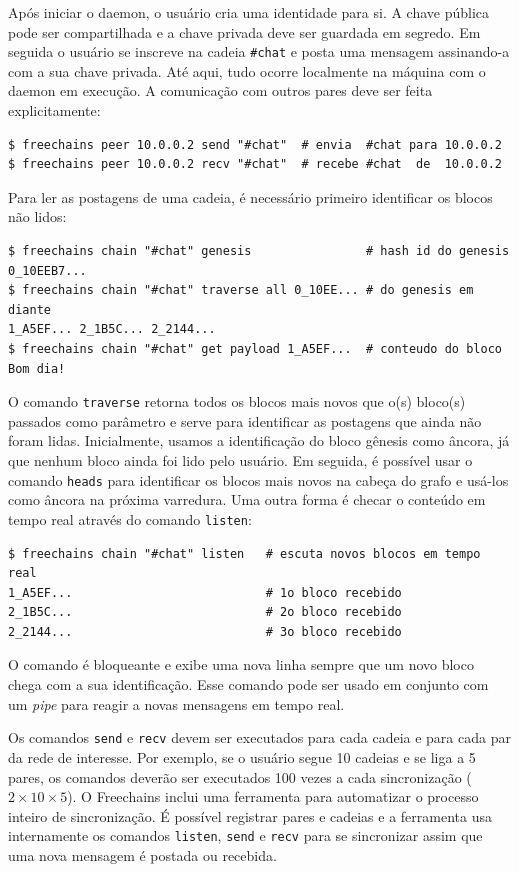 \documentclass[12pt]{article}
\newcommand{\FC} {Freechains\xspace}
\begin{document}
Após iniciar o daemon, o usuário cria uma identidade para si.
A chave pública pode ser compartilhada e a chave privada deve ser guardada em
segredo.
Em seguida o usuário se inscreve na cadeia \texttt{\#chat} e posta uma mensagem
assinando-a com a sua chave privada.
Até aqui, tudo ocorre localmente na máquina com o daemon em execução.
A comunicação com outros pares deve ser feita explicitamente:
%
{\footnotesize
\begin{verbatim}
$ freechains peer 10.0.0.2 send "#chat"  # envia  #chat para 10.0.0.2
$ freechains peer 10.0.0.2 recv "#chat"  # recebe #chat  de  10.0.0.2
\end{verbatim}
}
%
Para ler as postagens de uma cadeia, é necessário primeiro identificar os
blocos não lidos:
%
{\footnotesize
\begin{verbatim}
$ freechains chain "#chat" genesis                # hash id do genesis
0_10EEB7...
$ freechains chain "#chat" traverse all 0_10EE... # do genesis em diante
1_A5EF... 2_1B5C... 2_2144...
$ freechains chain "#chat" get payload 1_A5EF...  # conteudo do bloco
Bom dia!
\end{verbatim}
}

O comando \texttt{traverse} retorna todos os blocos mais novos que o(s)
bloco(s) passados como parâmetro e serve para identificar as postagens que
ainda não foram lidas.
Inicialmente, usamos a identificação do bloco gênesis como âncora, já que
nenhum bloco ainda foi lido pelo usuário.
Em seguida, é possível usar o comando \texttt{heads} para identificar os blocos
mais novos na cabeça do grafo e usá-los como âncora na próxima varredura.
%
Uma outra forma é checar o conteúdo em tempo real através do comando
\texttt{listen}:
%
{\footnotesize
\begin{verbatim}
$ freechains chain "#chat" listen   # escuta novos blocos em tempo real
1_A5EF...                           # 1o bloco recebido
2_1B5C...                           # 2o bloco recebido
2_2144...                           # 3o bloco recebido
\end{verbatim}
}
%
O comando é bloqueante e exibe uma nova linha sempre que um novo bloco chega
com a sua identificação.
Esse comando pode ser usado em conjunto com um \emph{pipe} para reagir a novas
mensagens em tempo real.

Os comandos \texttt{send} e \texttt{recv} devem ser executados para cada cadeia
e para cada par da rede de interesse.
Por exemplo, se o usuário segue 10 cadeias e se liga a 5 pares, os comandos
deverão ser executados 100 vezes a cada sincronização ($2\times10\times5$).
O \FC inclui uma ferramenta para automatizar o processo inteiro de
sincronização.
É possível registrar pares e cadeias e a ferramenta usa internamente os
comandos \texttt{listen}, \texttt{send} e \texttt{recv} para se sincronizar
assim que uma nova mensagem é postada ou recebida.
\end{document}
